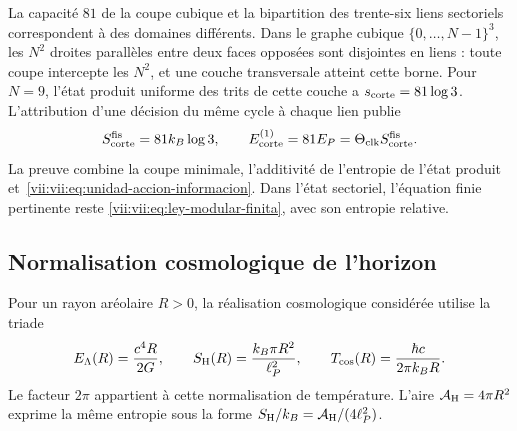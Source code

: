 La capacité \(81\) de la coupe cubique et la bipartition des trente-six
liens sectoriels correspondent à des domaines différents. Dans le
graphe cubique \(\{0,\ldots,N-1\}^3\), les \(N^2\) droites
parallèles entre deux faces opposées sont disjointes en liens : toute coupe
intercepte les \(N^2\), et une couche transversale atteint cette borne.
Pour \(N=9\), l'état produit uniforme des trits de cette couche
a \(s_{\rm corte}=81\log3\). L'attribution d'une décision du
même cycle à chaque lien publie
\begin{equation}
 S_{\rm corte}^{\rm fis}=81k_B\log3,\qquad
 E_{\rm corte}^{(1)}=81E_P
                  =\Theta_{\rm clk}S_{\rm corte}^{\rm fis}.
 \label{vii:vii:eq:corte-energia-informacion}
\end{equation}
La preuve combine la coupe minimale, l'additivité de l'entropie de l'état produit et~\eqref{vii:vii:eq:unidad-accion-informacion}. Dans l'état sectoriel, l'équation finie pertinente reste \eqref{vii:vii:eq:ley-modular-finita}, avec son entropie relative.

\subsection{Normalisation cosmologique de l'horizon}
\label{vii:vii:subsec:balance-horizonte}

Pour un rayon aréolaire \(R>0\), la réalisation cosmologique considérée utilise la triade
\begin{equation}
 E_\Lambda(R)=\frac{c^4R}{2G},\qquad
 S_{\rm H}(R)=\frac{k_B\pi R^2}{\ell_P^2},\qquad
 T_{\rm cos}(R)=\frac{\hbar c}{2\pi k_BR}.
 \label{vii:vii:eq:horizonte-cosmologico}
\end{equation}
Le facteur \(2\pi\) appartient à cette normalisation de température.
L'aire \(\mathcal A_{\rm H}=4\pi R^2\) exprime la même entropie
sous la forme \(S_{\rm H}/k_B=\mathcal A_{\rm H}/(4\ell_P^2)\).

